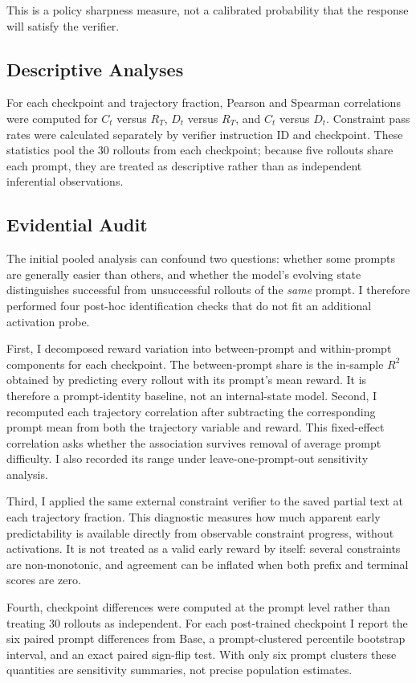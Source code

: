 \documentclass[manuscript,screen,nonacm]{acmart}
\begin{document}
This is a policy sharpness measure, not a calibrated probability that the
response will satisfy the verifier.

\subsection{Descriptive Analyses}

For each checkpoint and trajectory fraction, Pearson and Spearman correlations
were computed for $C_t$ versus $R_T$, $D_t$ versus $R_T$, and $C_t$ versus
$D_t$. Constraint pass rates were calculated separately by verifier instruction
ID and checkpoint. These statistics pool the 30 rollouts from each checkpoint;
because five rollouts share each prompt, they are treated as descriptive rather
than as independent inferential observations.

\subsection{Evidential Audit}

The initial pooled analysis can confound two questions: whether some prompts
are generally easier than others, and whether the model's evolving state
distinguishes successful from unsuccessful rollouts of the \emph{same} prompt.
I therefore performed four post-hoc identification checks that do not fit an
additional activation probe.

First, I decomposed reward variation into between-prompt and within-prompt
components for each checkpoint. The between-prompt share is the in-sample
$R^2$ obtained by predicting every rollout with its prompt's mean reward. It is
therefore a prompt-identity baseline, not an internal-state model. Second, I
recomputed each trajectory correlation after subtracting the corresponding
prompt mean from both the trajectory variable and reward. This fixed-effect
correlation asks whether the association survives removal of average prompt
difficulty. I also recorded its range under leave-one-prompt-out sensitivity
analysis.

Third, I applied the same external constraint verifier to the saved partial
text at each trajectory fraction. This diagnostic measures how much apparent
early predictability is available directly from observable constraint progress,
without activations. It is not treated as a valid early reward by itself:
several constraints are non-monotonic, and agreement can be inflated when both
prefix and terminal scores are zero.

Fourth, checkpoint differences were computed at the prompt level rather than
treating 30 rollouts as independent. For each post-trained checkpoint I report
the six paired prompt differences from Base, a prompt-clustered percentile
bootstrap interval, and an exact paired sign-flip test. With only six prompt
clusters these quantities are sensitivity summaries, not precise population
estimates.
\end{document}

